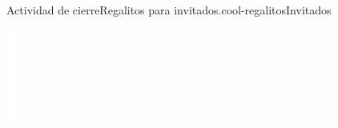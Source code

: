 \documentclass[14pt]{extarticle}
\begin{document}
\begin{project}{Actividad de cierre}{Regalitos para invitados.}{cool-regalitosInvitados}
\begin{sidebyside}{2}{0}{0}{0}
\begin{sbspanel}{0.5}
\end{sbspanel}%
\end{sidebyside}%
\begin{image}{0}{1}{0}{}%
\includegraphics[max width=\linewidth, center]{external/whitespace-tikz/2cm.pdf}
\end{image}%
\end{project}
\end{document}
